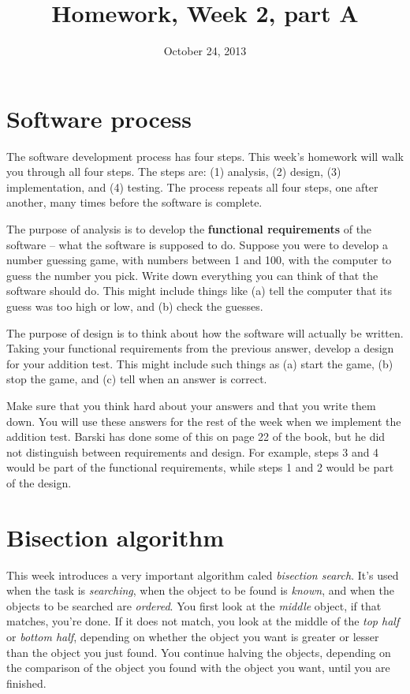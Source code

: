 \documentclass{article}
\title{Homework, Week 2, part A}
\date{October 24, 2013}
\begin{document}
\maketitle{}

\section{Software process}

The software development process has four steps. This week's homework will walk you through all four steps. The steps are: (1) analysis, (2) design, (3) implementation, and (4) testing. The process repeats all four steps, one after another, many times before the software is complete.

The purpose of analysis is to develop the \textbf{functional requirements} of the software -- what the software is supposed to do. Suppose you were to develop a number guessing game, with numbers between 1 and 100, with the computer to guess the number you pick. Write down everything you can think of that the software should do. This might include things like (a) tell the computer that its guess was too high or low, and (b) check the guesses.

The purpose of design is to think about how the software will actually be written. Taking your functional requirements from the previous answer, develop a design for your addition test. This might include such things as (a) start the game, (b) stop the game, and (c) tell when an answer is correct.

Make sure that you think hard about your answers and that you write them down. You will use these answers for the rest of the week when we implement the addition test. Barski has done some of this on page 22 of the book, but he did not distinguish between requirements and design. For example, steps 3 and 4 would be part of the functional requirements, while steps 1 and 2 would be part of the design.

\section{Bisection algorithm}

This week introduces a very important algorithm caled \textit{bisection search}. It's used when the task is \textit{searching}, when the object to be found is \textit{known}, and when the objects to be searched are \textit{ordered}. You first look at the \textit{middle} object, if that matches, you're done. If it does not match, you look at the middle of the \textit{top half} or \textit{bottom half}, depending on whether the object you want is greater or lesser than the object you just found. You continue halving the objects, depending on the comparison of the object you found with the object you want, until you are finished.
\end{document}
